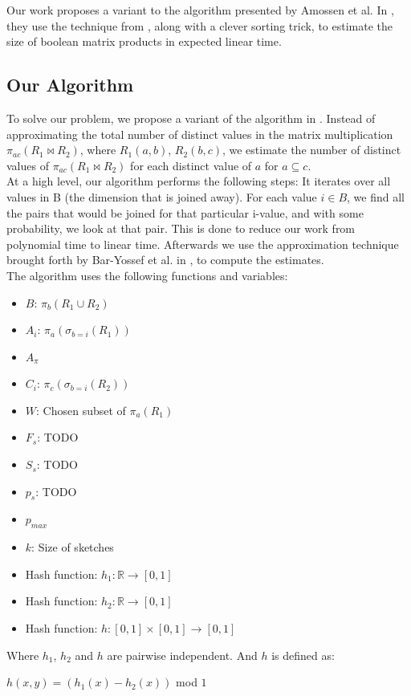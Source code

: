 \documentclass[a4paper,11pt]{article}
\begin{document}
Our work proposes a variant to the algorithm presented by Amossen et al. In \cite{paper:amossen}, they use the technique from \cite{paper:bar-yos}, along with a clever sorting trick, to estimate the size of boolean matrix products in expected linear time.

\subsection{Our Algorithm}
\label{subsub:alg}
To solve our problem, we propose a variant of the algorithm in \cite{paper:amossen}. Instead of approximating the total number of distinct values in the matrix multiplication $\pi_{ac}(R_1 \Join R_2)$, where $R_1(a,b)$, $R_2(b,c)$, we estimate the number of distinct values of $\pi_{ac}(R_1 \Join R_2)$ for each distinct value of $a$ for $a \subseteq c$.\\ %
At a high level, our algorithm performs the following steps: It iterates over all values in B (the dimension that is joined away). For each value $i \in B$, we find all the pairs that would be joined for that particular i-value, and with some probability, we look at that pair. This is done to reduce our work from polynomial time to linear time. Afterwards we use the approximation technique brought forth by Bar-Yossef et al. in \cite{paper:bar-yos}, to compute the estimates.\\

The algorithm uses the following functions and variables:

\begin{itemize}
  \item $B$: $\pi_{b}(R_1 \cup R_2)$
  \item $A_i$: $\pi_{a}(\sigma_{b=i}(R_1))$
  \item $A_{\pi}$
  \item $C_i$: $\pi_{c}(\sigma_{b=i}(R_2))$
  \item $W$: Chosen subset of $\pi_{a}(R_1)$
  \item $F_s$: TODO
  \item $S_s$: TODO
  \item $p_s$: TODO
  \item $p_{max}$
  \item $k$: Size of sketches
  \item Hash function: $h_1 : \mathbb{R} \rightarrow [0,1]$
  \item Hash function: $h_2 : \mathbb{R} \rightarrow [0,1]$
  \item Hash function: $h : [0,1] \times [0,1] \rightarrow [0,1]$
\end{itemize} 
Where $h_1$, $h_2$ and $h$ are pairwise independent. And $h$ is defined as:
\begin{center}
$h(x,y) = (h_1(x) - h_2(x))$ mod $1$
\end{center}
\end{document}
